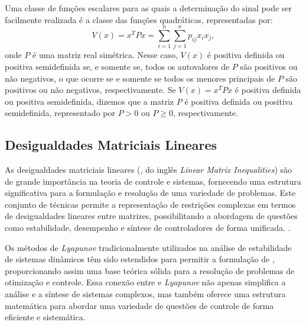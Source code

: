 Uma classe de funções escalares para as quais a determinação do sinal pode ser facilmente realizada é a classe das funções quadráticas, representadas por: \begin{equation}
  V(x) = x^T P x = \sum_{i=1}^n \sum_{j=1}^n p_{ij} x_i x_j,
  \label{eq:lyapunov4}
\end{equation} onde $P$ é uma matriz real simétrica. Nesse caso, $V(x)$ é positiva definida ou positiva semidefinida se, e somente se, todos os autovalores de $P$ são positivos ou não negativos, o que ocorre se e somente se todos os menores principais de $P$ são positivos ou não negativos, respectivamente. Se $V(x) = x^T P x$ é positiva definida ou positiva semidefinida, dizemos que a matriz $P$ é positiva definida ou positiva semidefinida, representado por $P > 0$ ou $P \geq 0$, respectivamente.

\subsection{Desigualdades Matriciais Lineares}

As desigualdades matriciais lineares (, do inglês \textit{Linear Matrix Inequalities}) são de grande importância na teoria de controle e sistemas, fornecendo uma estrutura significativa para a formulação e resolução de uma variedade de problemas. Este conjunto de técnicas permite a representação de restrições complexas em termos de desigualdades lineares entre matrizes, possibilitando a abordagem de questões como estabilidade, desempenho e síntese de controladores de forma unificada. \citep{boyd1994}.

Os métodos de \textit{Lyapunov }tradicionalmente utilizados na análise de estabilidade de sistemas dinâmicos têm sido estendidos para permitir a formulação de , proporcionando assim uma base teórica sólida para a resolução de problemas de otimização e controle. Essa conexão entre  e \textit{Lyapunov }não apenas simplifica a análise e a síntese de sistemas complexos, mas também oferece uma estrutura matemática para abordar uma variedade de questões de controle de forma eficiente e sistemática.

